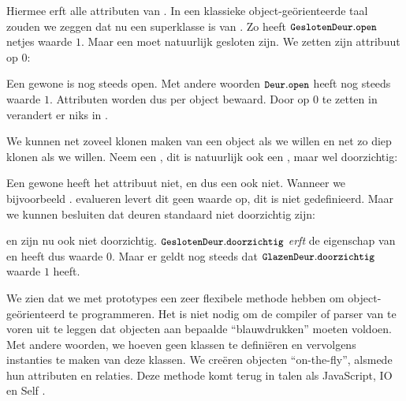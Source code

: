 \begin{codelines}
\end{codelines}

Hiermee erft  alle attributen van . In een klassieke object-geörienteerde taal zouden we zeggen dat  nu een superklasse is van . Zo heeft $\text{\ttfamily\small\upshape GeslotenDeur}.\text{\ttfamily\small\upshape open}$ netjes waarde $1$.
Maar een  moet natuurlijk gesloten zijn. We zetten zijn attribuut  op $0$:

\begin{codelines}
\end{codelines}

Een gewone  is nog steeds open. Met andere woorden $\text{\ttfamily\small\upshape Deur}.\text{\ttfamily\small\upshape open}$ heeft nog steeds waarde $1$.
Attributen worden dus per object bewaard. Door  op $0$ te zetten in  verandert er niks in .

We kunnen net zoveel klonen maken van een object als we willen en net zo diep klonen als we willen. Neem een , dit is natuurlijk ook een , maar wel doorzichtig:

\begin{codelines}
\end{codelines}

Een gewone  heeft het attribuut  niet, en dus een  ook niet. Wanneer we bijvoorbeeld . evalueren levert dit geen waarde op, dit is niet gedefinieerd.
Maar we kunnen besluiten dat deuren standaard niet doorzichtig zijn:

\begin{codelines}
\end{codelines}

en zijn nu ook niet doorzichtig. $\text{\ttfamily\small\upshape GeslotenDeur}.\text{\ttfamily\small\upshape doorzichtig}$ \emph{erft} de eigenschap van  en heeft dus waarde $0$. Maar er geldt nog steeds dat $\text{\ttfamily\small\upshape GlazenDeur}.\text{\ttfamily\small\upshape doorzichtig}$ waarde $1$ heeft.

We zien dat we met prototypes een zeer flexibele methode hebben om object-geörienteerd te programmeren. Het is niet nodig om de compiler of parser van te voren uit te leggen dat objecten aan bepaalde “blauwdrukken” moeten voldoen. Met andere woorden, we hoeven geen klassen te definiëren en vervolgens instanties te maken van deze klassen. We creëren objecten “on-the-fly”, alsmede hun attributen en relaties. Deze methode komt terug in talen als JavaScript, IO en Self \citep{javascript,io,self}.

